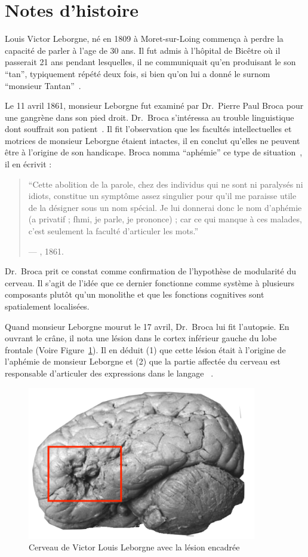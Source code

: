 \section{Notes d'histoire}

Louis Victor Leborgne, né en 1809 à Moret-sur-Loing commença à perdre la capacité de parler à l'age de 30 ans.
Il fut admis à l'hôpital de Bicêtre où il passerait 21 ans pendant lesquelles, 
il ne communiquait qu'en produisant le son ``tan'', typiquement répété deux fois, 
si bien qu'on lui a donné le surnom ``monsieur Tantan''~\cite{Mohammed_Narayan_Patra_Nanda_2018}.

Le 11 avril 1861, monsieur Leborgne fut examiné par Dr.~Pierre Paul Broca pour une gangrène dans son pied droit.
Dr.~Broca s'intéressa au trouble linguistique dont souffrait son patient~\cite{Lorch_2011}.
Il fit l'observation que les facultés intellectuelles et motrices de monsieur Leborgne étaient intactes,
il en conclut qu'elles ne peuvent être à l'origine de son handicape. 
Broca nomma ``aphémie'' ce type de situation~\cite{Broca}, il en écrivit :

\begin{quotation}
    ``Cette abolition de la parole, chez des individus qui ne sont ni paralysés ni idiots, constitue un symptôme assez singulier pour qu'il me paraisse utile de la désigner sous un nom spécial. Je lui donnerai donc le nom d'aphémie (\textgreek{a} privatif ; \textgreek{fhmi}, je parle, je prononce) ; car ce qui manque à ces malades, c'est seulement la faculté d'articuler les mots.''
    \begin{flushright}
        \rm --- \citeauthor{Broca}, 1861.
    \end{flushright}
\end{quotation}

Dr.~Broca prit ce constat comme confirmation de l'hypothèse de modularité du cerveau.
Il s'agit de l'idée que ce dernier fonctionne comme système à plusieurs composants plutôt qu'un monolithe
et que les fonctions cognitives sont spatialement localisées.

Quand monsieur Leborgne mourut le 17 avril, Dr.~Broca lui fit l'autopsie.
En ouvrant le crâne, il nota une lésion dans le cortex inférieur gauche du lobe frontale (Voire Figure~\ref{fig:leborgne-brain}).
Il en déduit (1) que cette lésion était à l'origine de l'aphémie de monsieur Leborgne et 
(2) que la partie affectée du cerveau est responsable d'articuler des expressions dans le langage
~\cite{Broca,Lorch_2011,Mohammed_Narayan_Patra_Nanda_2018}.

\begin{figure}[htb]
    \begin{center}
        \includegraphics[width=10cm]{assets/images/leborgne-brain.png}
    \end{center}
    \caption{Cerveau de Victor Louis Leborgne avec la lésion encadrée}
    \label{fig:leborgne-brain}
\end{figure}
